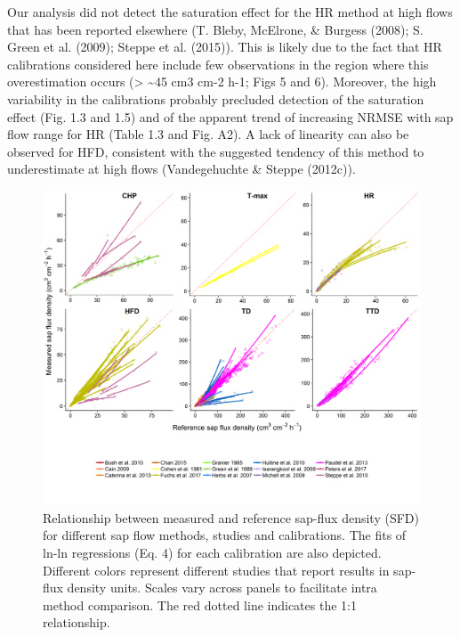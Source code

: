 \documentclass[11pt,twoside]{reedthesis}
\begin{document}
Our analysis did not detect the saturation effect for the HR method at
high flows that has been reported elsewhere (T. Bleby, McElrone, \&
Burgess (2008); S. Green et al. (2009); Steppe et al. (2015)). This is
likely due to the fact that HR calibrations considered here include few
observations in the region where this overestimation occurs
(\textgreater{} \textasciitilde{}45 cm3 cm-2 h-1; Figs 5 and 6).
Moreover, the high variability in the calibrations probably precluded
detection of the saturation effect (Fig. 1.3 and 1.5) and of the
apparent trend of increasing NRMSE with sap flow range for HR (Table 1.3
and Fig. A2). A lack of linearity can also be observed for HFD,
consistent with the suggested tendency of this method to underestimate
at high flows (Vandegehuchte \& Steppe (2012c)).\par
\begin{figure}[p]

{\centering \includegraphics[width=1\linewidth]{figure/CH2/figure-density} 

}

\caption{Relationship between measured and reference sap-flux density (SFD) for different sap flow methods, studies and calibrations. The fits of ln-ln regressions (Eq. 4) for each calibration are also depicted. Different colors represent different studies that report results in sap-flux density units. Scales vary across panels to facilitate intra method comparison. The red dotted line indicates the 1:1 relationship.}\label{fig:ch1fig5}
\end{figure}
\end{document}
